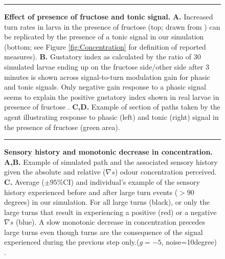 \documentclass[11pt,a4paper]{article}
\newcommand{\todoBW}[1]{\todo[author=BW,color=orange, size=\tiny,inline]{#1}}
\begin{document}
\begin{figure}
\begin{center}
\caption{{\bf Effect of presence of fructose and tonic signal.}
{\bf A.} Increased turn rates in larva in the presence of fructose (top; drawn from \citep{schleyer2015learning}) can be replicated by the presence of a tonic signal in our simulation (bottom; see Figure \ref{fig:Concentration} for definition of reported measures). 
{\bf B.} Gustatory index as calculated by the ratio of 30 simulated larvae ending up on the fructose side/other side after 3 minutes is shown across signal-to-turn modulation gain for phasic and tonic signals. Only negative gain response to a phasic signal seems to explain the positive gustatory index shown in real larvae in presence of fructose \citep{schleyer2011behavior}.
{\bf C,D.} Example of section of paths taken by the agent illustrating response to phasic (left) and tonic (right) signal in the presence of fructose (green area).
\label{fig:Tonic}}
\end{center}
\hrule
\end{figure}


\begin{figure}
\begin{center}
\caption{{\bf Sensory history and monotonic decrease in concentration.} {\bf A,B.} Example of simulated path and the associated sensory history given the absolute and relative ($\nabla s$) odour concentration perceived.
{\bf  C.} Average ($\pm 95\%$CI) and individual’s example of the sensory history experienced before and after large turn events ($>90$ degrees) in our simulation. For all large turns (black), or only the large turns that result in experiencing a positive (red) or a negative $\nabla s$ (blue). A slow monotonic decrease in concentration precedes large turns even though turns are the consequence of the signal experienced during the previous step only.($g=-5$, noise=10degree) .
\label{fig:SensoryHistory}}
\end{center}
\hrule
\end{figure}
\end{document}
